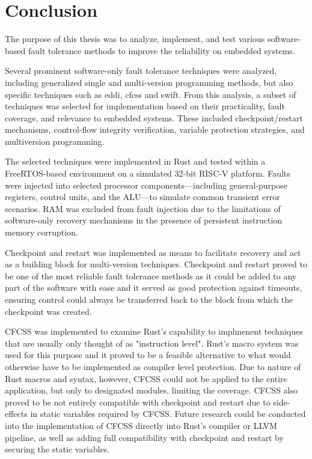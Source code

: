 \documentclass[12pt, letterpaper]{article}
\begin{document}


\clearpage


\clearpage
\section{Conclusion}

The purpose of this thesis was to analyze, implement, and test various software-based fault tolerance methods to improve the reliability on embedded systems.

Several prominent software-only fault tolerance techniques were analyzed, including generalized single and multi-version programming methods, but also specific techniques such as \acrshort{eddi}, \acrshort{cfcss} and \acrshort{swift}. From this analysis, a subset of techniques was selected for implementation based on their practicality, fault coverage, and relevance to embedded systems. These included checkpoint/restart mechanisms, control-flow integrity verification, variable protection strategies, and multiversion programming.

The selected techniques were implemented in Rust and tested within a FreeRTOS-based environment on a simulated 32-bit RISC-V platform. Faults were injected into selected processor components—including general-purpose registers, control units, and the ALU—to simulate common transient error scenarios. RAM was excluded from fault injection due to the limitations of software-only recovery mechanisms in the presence of persistent instruction memory corruption.

Checkpoint and restart was implemented as means to facilitate recovery and act as a building block for multi-version techniques. Checkpoint and restart proved to be one of the most reliable fault tolerance methods as it could be added to any part of the software with ease and it served as good protection against timeouts, ensuring control could always be transferred back to the block from which the checkpoint was created.

CFCSS was implemented to examine Rust's capability to implmenent techniques that are usually only thought of as "instruction level". Rust's macro system was used for this purpose and it proved to be a feasible alternative to what would otherwise have to be implemented as compiler level protection. Due to nature of Rust macros and syntax, however, CFCSS could not be applied to the entire application, but only to designated modules, limiting the coverage. CFCSS also proved to be not entirely compatible with checkpoint and restart due to side-effects in static variables required by CFCSS. Future research could be conducted into the implementation of CFCSS directly into Rust's compiler or LLVM pipeline, as well as adding full compatibility with checkpoint and restart by securing the static variables.
\end{document}
